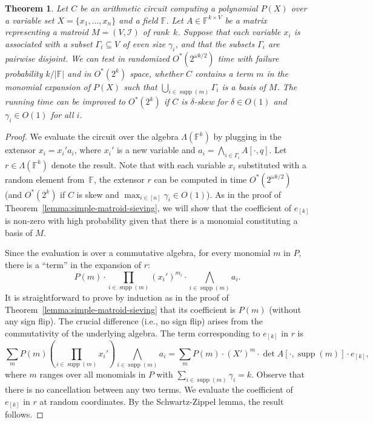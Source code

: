 \documentclass[10pt,a4paper]{article}
\newtheorem{theorem}{Theorem}[section]
\newcommand{\F}{\ensuremath{\mathbb F}\xspace}
\newcommand{\cI}{\ensuremath{\mathcal I}\xspace}
\DeclareMathOperator{\supp}{supp}
\begin{document}
\begin{theorem} \label{lemma:extensor-matroid-sieving}
  Let $C$ be an arithmetic circuit computing a polynomial $P(X)$ over a variable set $X = \{ x_1, \dots, x_n \}$ and a field $\F$.
  Let $A \in \F^{k \times V}$ be a matrix representing a matroid $M=(V, \cI)$ of rank~$k$. 
  Suppose that each variable $x_i$ is associated with a subset $\Gamma_i \subseteq V$ of \emph{even} size $\gamma_i$, and that the subsets $\Gamma_i$ are pairwise disjoint.
  We can test in randomized $O^*(2^{\omega k / 2})$ time with failure probability $k / |\F|$ and in $O^*(2^k)$ space, whether $C$ contains a term $m$ in the monomial expansion of $P(X)$ such that $\bigcup_{i \in \supp(m)} \Gamma_i$ is a basis of $M$.
  The running time can be improved to $O^*(2^{k})$ if $C$ is $\delta$-skew for $\delta \in O(1)$ and $\gamma_i \in O(1)$ for all $i$.
\end{theorem}
\begin{proof}
  We evaluate the circuit over the algebra $\Lambda(\F^{k})$ by plugging in the extensor $x_i = x_i' a_i$, where $x_i'$ is a new variable and $a_i = \bigwedge_{i \in \Gamma_i} A[\cdot, q]$. 
  Let $r \in \Lambda(\F^{k})$ denote the result.
  Note that with each variable $x_i$ substituted with a random element from~$\F$, the extensor $r$ can be computed in time $O^*(2^{\omega k /2})$ (and $O^*(2^k)$ if $C$ is skew and $\max_{i \in [n]} \gamma_i \in O(1)$).
  As in the proof of Theorem~\ref{lemma:simple-matroid-sieving}, we will show that the coefficient of $e_{[k]}$ is non-zero with high probability given that there is a monomial constituting a basis of $M$.

  Since the evaluation is over a commutative algebra, for every monomial $m$ in $P$, there is a ``term'' in the expansion of $r$:
  \[
    P(m) \cdot \prod_{i \in \supp(m)} (x_i')^{m_i} \cdot \bigwedge_{i \in \supp(m)} a_i.
  \]
  It is straightforward to prove by induction as in the proof of Theorem~\ref{lemma:simple-matroid-sieving} that its coefficient is $P(m)$ (without any sign flip).
  The crucial difference (i.e., no sign flip) arises from the commutativity of the underlying algebra.
  The term corresponding to $e_{[k]}$ in $r$ is
  \[
    \sum_{m} P(m) \left(\prod_{i \in \supp(m)} x_i'\right) \bigwedge_{i \in \supp(m)} a_i
    = \sum_{m} P(m) \cdot (X')^{m} \cdot \det A[\cdot, \supp(m)] \cdot e_{[k]},
  \]
  where $m$ ranges over all monomials in $P$ with $\sum_{i \in \supp(m)} \gamma_i = k$.
  Observe that there is no cancellation between any two terms.
  We evaluate the coefficient of $e_{[k]}$ in $r$ at random coordinates.
  By the Schwartz-Zippel lemma, the result follows.
\end{proof}
\end{document}
